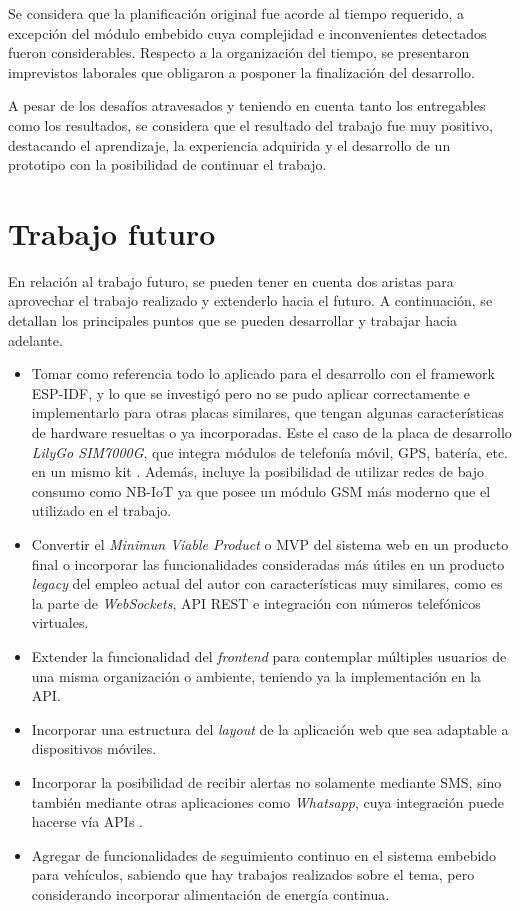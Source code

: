 Se considera que la planificación original fue acorde al tiempo requerido, a excepción del módulo embebido cuya complejidad e inconvenientes detectados fueron considerables. Respecto a la organización del tiempo, se presentaron imprevistos laborales que obligaron a posponer la finalización del desarrollo.

A pesar de los desafíos atravesados y teniendo en cuenta tanto los entregables como los resultados, se considera que el resultado del trabajo fue muy positivo, destacando el aprendizaje, la experiencia adquirida y el desarrollo de un prototipo con la posibilidad de continuar el trabajo.

\section{Trabajo futuro}

En relación al trabajo futuro, se pueden tener en cuenta dos aristas para aprovechar el trabajo realizado y extenderlo hacia el futuro. A continuación, se detallan los principales puntos que se pueden desarrollar y trabajar hacia adelante.

\begin{itemize}
	\item Tomar como referencia todo lo aplicado para el desarrollo con el framework ESP-IDF, y lo que se investigó pero no se pudo aplicar correctamente e implementarlo para otras placas similares, que tengan algunas características de hardware resueltas o ya incorporadas. Este el caso de la placa de desarrollo \textit{LilyGo SIM7000G}, que integra módulos de telefonía móvil, GPS, batería, etc. en un mismo kit \citep{7600G:1}. Además, incluye la posibilidad de utilizar redes de bajo consumo como NB-IoT \citep{NBIOT:1} ya que posee un módulo GSM más moderno que el utilizado en el trabajo.
	\item Convertir el \textit{Minimun Viable Product} o MVP del sistema web en un producto final o incorporar las funcionalidades consideradas más útiles en un producto \textit{legacy} del empleo actual del autor con características muy similares, como es la parte de \textit{WebSockets}, API REST e integración con números telefónicos virtuales.
	\item Extender la funcionalidad del \textit{frontend} para contemplar múltiples usuarios de una misma organización o ambiente, teniendo ya la implementación en la API.
	\item Incorporar una estructura del \textit{layout} de la aplicación web que sea adaptable a dispositivos móviles.
	\item Incorporar la posibilidad de recibir alertas no solamente mediante SMS, sino también mediante otras aplicaciones como \textit{Whatsapp}, cuya integración puede hacerse vía APIs \citep{TWILIO:3}.
	\item Agregar de funcionalidades de seguimiento continuo en el sistema embebido para vehículos, sabiendo que hay trabajos realizados sobre el tema, pero considerando incorporar alimentación de energía continua.
\end{itemize}
